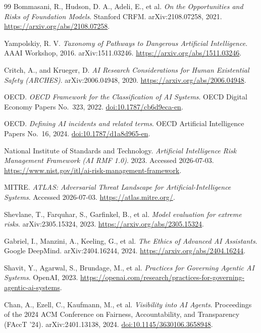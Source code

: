 \documentclass[11pt]{article}
\begin{document}
\begin{thebibliography}{99}
Bommasani, R., Hudson, D. A., Adeli, E., et al. \textit{On the Opportunities and Risks of Foundation Models}. Stanford CRFM. arXiv:2108.07258, 2021. \url{https://arxiv.org/abs/2108.07258}.

Yampolskiy, R. V. \textit{Taxonomy of Pathways to Dangerous Artificial Intelligence}. AAAI Workshop, 2016. arXiv:1511.03246. \url{https://arxiv.org/abs/1511.03246}.

Critch, A., and Krueger, D. \textit{AI Research Considerations for Human Existential Safety (ARCHES)}. arXiv:2006.04948, 2020. \url{https://arxiv.org/abs/2006.04948}.

OECD. \textit{OECD Framework for the Classification of AI Systems}. OECD Digital Economy Papers No.\ 323, 2022. \href{https://doi.org/10.1787/cb6d9eca-en}{doi:10.1787/cb6d9eca-en}.

OECD. \textit{Defining AI incidents and related terms}. OECD Artificial Intelligence Papers No.\ 16, 2024. \href{https://doi.org/10.1787/d1a8d965-en}{doi:10.1787/d1a8d965-en}.

National Institute of Standards and Technology. \textit{Artificial Intelligence Risk Management Framework (AI RMF 1.0)}. 2023. Accessed 2026-07-03. \url{https://www.nist.gov/itl/ai-risk-management-framework}.

MITRE. \textit{ATLAS: Adversarial Threat Landscape for Artificial-Intelligence Systems}. Accessed 2026-07-03. \url{https://atlas.mitre.org/}.

Shevlane, T., Farquhar, S., Garfinkel, B., et al. \textit{Model evaluation for extreme risks}. arXiv:2305.15324, 2023. \url{https://arxiv.org/abs/2305.15324}.

Gabriel, I., Manzini, A., Keeling, G., et al. \textit{The Ethics of Advanced AI Assistants}. Google DeepMind. arXiv:2404.16244, 2024. \url{https://arxiv.org/abs/2404.16244}.

Shavit, Y., Agarwal, S., Brundage, M., et al. \textit{Practices for Governing Agentic AI Systems}. OpenAI, 2023. \url{https://openai.com/research/practices-for-governing-agentic-ai-systems}.

Chan, A., Ezell, C., Kaufmann, M., et al. \textit{Visibility into AI Agents}. Proceedings of the 2024 ACM Conference on Fairness, Accountability, and Transparency (FAccT '24). arXiv:2401.13138, 2024. \href{https://doi.org/10.1145/3630106.3658948}{doi:10.1145/3630106.3658948}.


\end{thebibliography}
\end{document}

